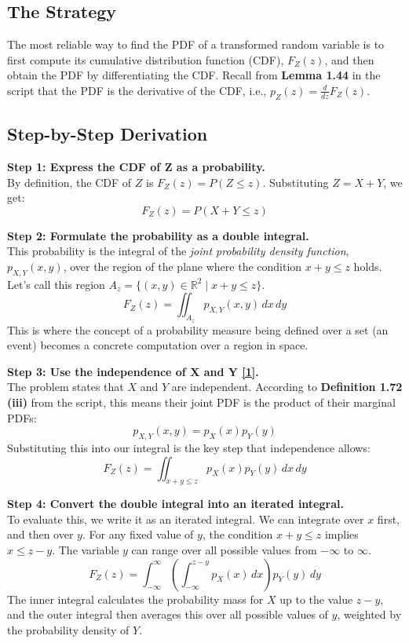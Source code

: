 \documentclass[11pt,a4paper]{article}
\begin{document}
\subsection{The Strategy}
The most reliable way to find the PDF of a transformed random variable is to first compute its cumulative distribution function (CDF), $F_Z(z)$, and then obtain the PDF by differentiating the CDF. Recall from \textbf{Lemma 1.44} in the script that the PDF is the derivative of the CDF, i.e., $p_Z(z) = \frac{d}{dz}F_Z(z)$.

\subsection{Step-by-Step Derivation}
\noindent\textbf{Step 1: Express the CDF of Z as a probability.} \\
By definition, the CDF of $Z$ is $F_Z(z) = P(Z \leq z)$. Substituting $Z=X+Y$, we get:
\[
F_Z(z) = P(X+Y \leq z)
\]

\noindent\textbf{Step 2: Formulate the probability as a double integral.} \\
This probability is the integral of the \textit{joint probability density function}, $p_{X,Y}(x,y)$, over the region of the plane where the condition $x+y \leq z$ holds. Let's call this region $A_z = \{(x,y) \in \mathbb{R}^2 \mid x+y \leq z\}$.
\[
F_Z(z) = \iint_{A_z} p_{X,Y}(x,y) \, dx \, dy
\]
This is where the concept of a probability measure being defined over a set (an event) becomes a concrete computation over a region in space.

\noindent\textbf{Step 3: Use the independence of X and Y \hyperlink{note_independence}{[1]}.} \\
The problem states that $X$ and $Y$ are independent. According to \textbf{Definition 1.72 (iii)} from the script, this means their joint PDF is the product of their marginal PDFs:
\[
p_{X,Y}(x,y) = p_X(x) p_Y(y)
\]
Substituting this into our integral is the key step that independence allows:
\[
F_Z(z) = \iint_{x+y \leq z} p_X(x) p_Y(y) \, dx \, dy
\]

\noindent\textbf{Step 4: Convert the double integral into an iterated integral.} \\
To evaluate this, we write it as an iterated integral. We can integrate over $x$ first, and then over $y$. For any fixed value of $y$, the condition $x+y \leq z$ implies $x \leq z-y$. The variable $y$ can range over all possible values from $-\infty$ to $\infty$.
\[
F_Z(z) = \int_{-\infty}^{\infty} \left( \int_{-\infty}^{z-y} p_X(x) \, dx \right) p_Y(y) \, dy
\]
The inner integral calculates the probability mass for $X$ up to the value $z-y$, and the outer integral then averages this over all possible values of $y$, weighted by the probability density of $Y$.
\end{document}
